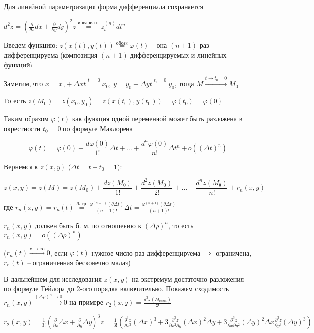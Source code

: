 \documentclass[12pt]{article}
\begin{document}
    Для линейной параметризации форма дифференциала сохраняется

    $d^2 z = \left(\frac{\partial }{\partial x}dx + \frac{\partial}{\partial y}dy\right)^2 z \stackrel{\text{инвариант}}{=} z^{(n)}_t dt^n$

    Введем функцию: $z(x(t), y(t)) \stackrel{\text{обозн}}{=} \varphi (t)$ -- она $(n + 1)$ раз дифференцируема (композиция $(n + 1)$ дифференцируемых и линейных функций)

    Заметим, что $x = x_0 + \Delta x t \stackrel{t_0 = 0}{=} x_0$, $y = y_0 + \Delta y t \stackrel{t_0 = 0}{=} y_0$, тогда $M \stackrel{t \to t_0 = 0}{\rightarrow} M_0$

    То есть $z(M_0) = z(x_0, y_0) = z(x(t_0), y(t_0)) = \varphi (t_0) = \varphi(0)$

    Таким образом $\varphi(t)$ как функция одной переменной может быть разложена в окрестности $t_0 = 0$ по формуле Маклорена

    \[\varphi(t) = \varphi(0) + \frac{d\varphi(0)}{1!} \Delta t + \dots + \frac{d^{n}\varphi(0)}{n!} \Delta t^n + o((\Delta t)^n)\]

    Вернемся к $z(x, y)$ ($\Delta t = t - t_0 = 1$):

    \[z(x, y) = z(M) = z(M_0) + \frac{dz(M_0)}{1!} + \frac{d^2 z(M_0)}{2!} + \dots + \frac{d^n z(M_0)}{n!} + r_n(x, y)\]

    где $r_n(x, y) = r_n(t) \stackrel{\text{Лагр.}}{=} \frac{\varphi^{(n+1)}(\theta \Delta t)}{(n + 1)!} \Delta t = \frac{\varphi^{(n+1)}(\theta \Delta t)}{(n + 1)!}$

    $r_n(x, y)$ должен быть б. м. по отношению к $(\Delta \rho)^n$, то есть $r_n(x, y) = o((\Delta \rho)^n)$

    ($r_n(t) \stackrel{n \to \infty}{\rightarrow} 0$, если $\varphi(t)$ нужное число раз дифференцируема $\Rightarrow$ ограничена, $r_n(t)$ -- ограниченная бесконечно малая)

    \Nota В дальнейшем для исследования $z(x, y)$ на экстремум достаточно разложения по формуле Тейлора до 2-ого порядка включительно.
    Покажем сходимость $r_n(x, y) \stackrel{(\Delta \rho)^n \to 0}{\rightarrow} 0$ на примере $\displaystyle r_2 (x, y) = \frac{d^3 z(M_{\text{сред.}})}{3!}$


    $r_2(x, y) = \frac{1}{3!} \left(\frac{\partial}{\partial x} \Delta x + \frac{\partial}{\partial y} \Delta y\right)^3 z =
    \frac{1}{3!} \left(\frac{\partial^3 z}{\partial x^3} (\Delta x)^3 + 3 \frac{\partial^3 z}{\partial x^2 \partial y} (\Delta x)^2 \Delta y +
    3 \frac{\partial^3 z}{\partial x \partial y^2} (\Delta y)^2 \Delta x \frac{\partial^3 z}{\partial y^3} (\Delta y)^3\right)$
\end{document}
